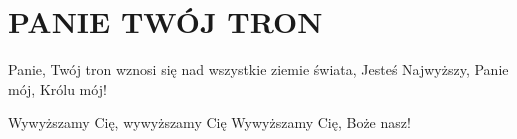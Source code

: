 \documentclass[../../../songbook.tex]{subfiles}
\begin{document}
\TabPositions{9cm} %
\section*{PANIE TWÓJ TRON}
{}
\vspace{0.5cm}
Panie, Twój tron wznosi się nad wszystkie ziemie świata, 	 \newline	 
Jesteś Najwyższy, Panie mój, Królu mój!						 \newline	 

\-\hspace{1cm} Wywyższamy Cię, wywyższamy Cię	 \newline	
\-\hspace{1cm} Wywyższamy Cię, Boże nasz!		 \newline	
\end{document}

